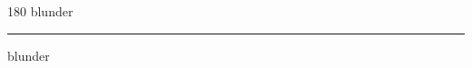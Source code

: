 
\begin{frame}
\begin{center}
\begin{turn}{180}
{\fontsize{2.5cm}{1em}\selectfont blunder}
\end{turn}
\vspace{1em}\par  
\hrule
\vspace{1em}\par  
{\fontsize{2.5cm}{1em}\selectfont blunder}
\end{center}
\end{frame}
